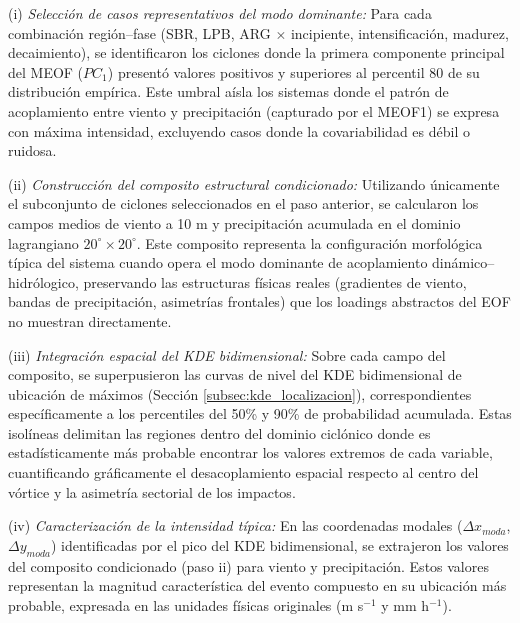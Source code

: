 (i) \textit{Selección de casos representativos del modo dominante:} Para cada combinación región--fase (SBR, LPB, ARG $\times$ incipiente, intensificación, madurez, decaimiento), se identificaron los ciclones donde la primera componente principal del MEOF ($PC_{1}$) presentó valores positivos y superiores al percentil 80 de su distribución empírica. Este umbral aísla los sistemas donde el patrón de acoplamiento entre viento y precipitación (capturado por el MEOF1) se expresa con máxima intensidad, excluyendo casos donde la covariabilidad es débil o ruidosa.

(ii) \textit{Construcción del composito estructural condicionado:} Utilizando únicamente el subconjunto de ciclones seleccionados en el paso anterior, se calcularon los campos medios de viento a 10 m y precipitación acumulada en el dominio lagrangiano $20^{\circ} \times 20^{\circ}$. Este composito representa la configuración morfológica típica del sistema cuando opera el modo dominante de acoplamiento dinámico--hidrólogico, preservando las estructuras físicas reales (gradientes de viento, bandas de precipitación, asimetrías frontales) que los loadings abstractos del EOF no muestran directamente.

(iii) \textit{Integración espacial del KDE bidimensional:} Sobre cada campo del composito, se superpusieron las curvas de nivel del KDE bidimensional de ubicación de máximos (Sección \ref{subsec:kde_localizacion}), correspondientes específicamente a los percentiles del 50\% y 90\% de probabilidad acumulada. Estas isolíneas delimitan las regiones dentro del dominio ciclónico donde es estadísticamente más probable encontrar los valores extremos de cada variable, cuantificando gráficamente el desacoplamiento espacial respecto al centro del vórtice y la asimetría sectorial de los impactos.

(iv) \textit{Caracterización de la intensidad típica:} En las coordenadas modales ($\Delta x_{moda}$, $\Delta y_{moda}$) identificadas por el pico del KDE bidimensional, 
se extrajeron los valores del composito condicionado (paso ii) para viento y precipitación. Estos valores representan la magnitud característica del evento compuesto en su ubicación más probable, expresada en las unidades físicas originales (m s$^{-1}$ y mm h$^{-1}$).

